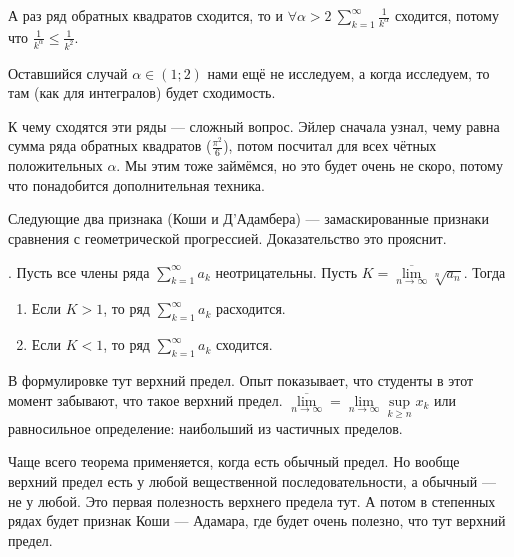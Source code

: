 \documentclass{article}
\begin{document}
\begin{itemize}
\begin{Example}
        \end{Example}
        \begin{Example}
            А раз ряд обратных квадратов сходится, то и $\forall\alpha>2~\sum\limits_{k=1}^\infty \frac1{k^\alpha}$ сходится, потому что $\frac1{k^\alpha}\leqslant\frac1{k^2}$.
        \end{Example}
        \begin{Comment}
            Оставшийся случай $\alpha\in(1;2)$ нами ещё не исследуем, а когда исследуем, то там (как для интегралов) будет сходимость.
        \end{Comment}
        \begin{Comment}
            К чему сходятся эти ряды --- сложный вопрос. Эйлер сначала узнал, чему равна сумма ряда обратных квадратов ($\frac{\pi^2}6$), потом посчитал для всех чётных положительных $\alpha$. Мы этим тоже займёмся, но это будет очень не скоро, потому что понадобится дополнительная техника.
        \end{Comment}
        \begin{Comment}
            Следующие два признака (Коши и Д'Адамбера) --- замаскированные признаки сравнения с геометрической прогрессией. Доказательство это прояснит.
        \end{Comment}
        \thm {}. Пусть все члены ряда $\sum\limits_{k=1}^\infty a_k$ неотрицательны. Пусть $K=\overline{\lim\limits_{n\to\infty}}\sqrt[n]{a_n}$. Тогда
        \begin{enumerate}
            \item Если $K>1$, то ряд $\sum\limits_{k=1}^\infty a_k$ расходится.
            \item Если $K<1$, то ряд $\sum\limits_{k=1}^\infty a_k$ сходится.
        \end{enumerate}
        \begin{Comment}
            В формулировке тут верхний предел. Опыт показывает, что студенты в этот момент забывают, что такое верхний предел. $\overline{\lim\limits_{n\to\infty}}=\lim\limits_{n\to\infty}\sup\limits_{k\geqslant n}x_k$ или равносильное определение: наибольший из частичных пределов.
        \end{Comment}
        \begin{Comment}
            Чаще всего теорема применяется, когда есть обычный предел. Но вообще верхний предел есть у любой вещественной последовательности, а обычный --- не у любой. Это первая полезность верхнего предела тут. А потом в степенных рядах будет признак Коши --- Адамара, где будет очень полезно, что тут верхний предел.

\end{Comment}
\end{itemize}
\end{document}
